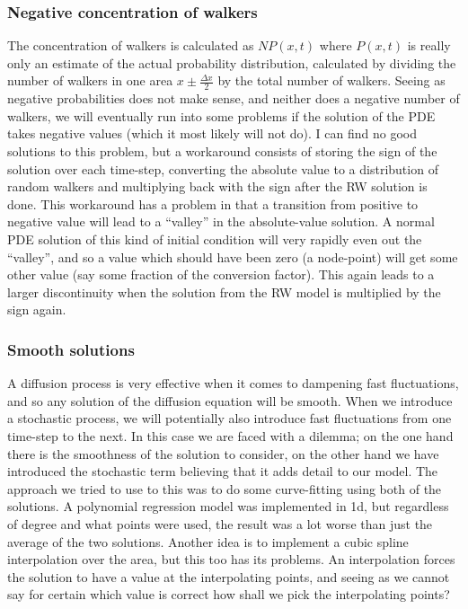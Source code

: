 \subsubsection{Negative concentration of walkers}
 The concentration of walkers is calculated as $NP(x,t)$ where $P(x,t)$ is really only an estimate of the actual probability distribution, calculated by dividing the number of walkers in one area $x\pm\frac{\Delta x}{2}$ by the total number of walkers. 
 Seeing as negative probabilities does not make sense, and neither does a negative number of walkers, we will eventually run into some problems if the solution of the PDE takes negative values (which it most likely will not do). 
 I can find no good solutions to this problem, but a workaround consists of storing the sign of the solution over each time-step, converting the absolute value to a distribution of random walkers and multiplying back with the sign after the RW solution is done. 
 This workaround has a problem in that a transition from positive to negative value will lead to a ``valley'' in the absolute-value solution. 
 A normal PDE solution of this kind of initial condition will very rapidly even out the ``valley'', and so a value which should have been zero (a node-point) will get some other value (say some fraction of the conversion factor). This again leads to a larger discontinuity when the solution from the RW model is multiplied by the sign again.

\subsubsection{Smooth solutions}
 A diffusion process is very effective when it comes to dampening fast fluctuations, and so any solution of the diffusion equation will be smooth. 
 When we introduce a stochastic process, we will potentially also introduce fast fluctuations from one time-step to the next. 
 In this case we are faced with a dilemma; on the one hand there is the smoothness of the solution to consider, on the other hand we have introduced the stochastic term believing that it adds detail to our model. 
 The approach we tried to use to this was to do some curve-fitting using both of the solutions. 
 A polynomial regression model was implemented in 1d, but regardless of degree and what points were used, the result was a lot worse than just the average of the two solutions. 
 Another idea is to implement a cubic spline interpolation over the area, but this too has its problems. An interpolation forces the solution to have a value at the interpolating points, and seeing as we cannot say for certain which value is correct how shall we pick the interpolating points?

